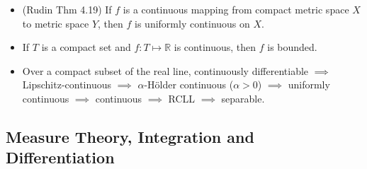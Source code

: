 \documentclass[twoside]{article}
\newcommand\bbR{\mathbb{R}}
\begin{document}
\begin{itemize}
\item (Rudin Thm 4.19) If $f$ is a continuous mapping from compact metric space $X$ to metric space $Y$, then $f$ is uniformly continuous on $X$.

\item If $T$ is a compact set and $f: T \mapsto \bbR$ is continuous, then $f$ is bounded.

\item Over a compact subset of the real line, continuously differentiable $\implies$ Lipschitz-continuous $\implies$ $\alpha$-H\"{o}lder continuous ($\alpha > 0$) $\implies$ uniformly continuous $\implies$ continuous $\implies$ RCLL $\implies$ separable.

\end{itemize}

\subsection{Measure Theory, Integration and Differentiation}
\end{document}
